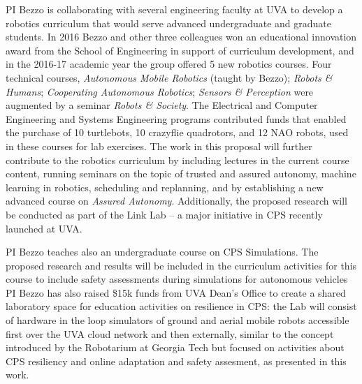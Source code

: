 PI Bezzo is collaborating with several engineering faculty at UVA to develop a robotics curriculum that would serve advanced undergraduate and graduate students. In 2016 Bezzo and other three colleagues won an educational innovation award from the School of Engineering in support of curriculum development, and in the 2016-17 academic year the group offered 5 new robotics courses.   Four technical courses, {\em Autonomous Mobile Robotics} (taught by Bezzo); {\em Robots \& Humans}; {\em Cooperating Autonomous Robotics}; {\em Sensors \& Perception} were augmented by a seminar {\em Robots \& Society}.  The Electrical and Computer Engineering and Systems Engineering programs contributed funds that enabled the purchase of 10 turtlebots, 10 crazyflie quadrotors, and 12 NAO robots, used in these courses for lab exercises. The work in this proposal will further contribute to the robotics curriculum by including lectures in the current course content, running seminars on the topic of trusted and assured autonomy, machine learning in robotics, scheduling and replanning, and by establishing a new advanced course on {\em Assured Autonomy}. 
Additionally,  the proposed research will be conducted as part of the Link Lab --
a major initiative in CPS recently launched at UVA. 

PI Bezzo teaches also an undergraduate course on CPS Simulations. The proposed research and results will be included in the curriculum activities for this course to include safety assessments during simulations for autonomous vehicles 
PI Bezzo has also raised \$15k funds from UVA Dean's Office to create a shared laboratory space for education activities on resilience in CPS: the Lab will consist of hardware in the loop simulators of ground and aerial mobile robots accessible first over the UVA cloud network and then externally, similar to the concept introduced by the Robotarium at Georgia Tech \cite{robotarium} but focused on activities about CPS resiliency and online adaptation and safety assesment, as presented in this work.

